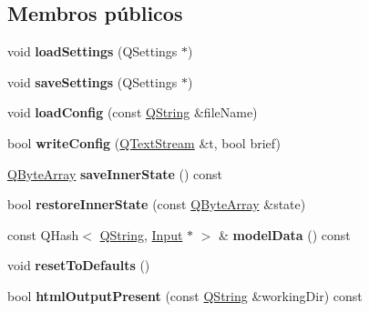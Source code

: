\subsection*{Membros públicos}
\begin{DoxyCompactItemize}
\item 
\hypertarget{class_expert_aaf7577cd0bea70f9f3463daff408f109}{void {\bfseries load\-Settings} (Q\-Settings $\ast$)}\label{class_expert_aaf7577cd0bea70f9f3463daff408f109}

\item 
\hypertarget{class_expert_a898d0b7c011edae3399d1af98e61f23d}{void {\bfseries save\-Settings} (Q\-Settings $\ast$)}\label{class_expert_a898d0b7c011edae3399d1af98e61f23d}

\item 
\hypertarget{class_expert_a7c2c676b7cf5006690dc56330f9091b7}{void {\bfseries load\-Config} (const \hyperlink{class_q_string}{Q\-String} \&file\-Name)}\label{class_expert_a7c2c676b7cf5006690dc56330f9091b7}

\item 
\hypertarget{class_expert_ae0e179390ef2007cf8f9129ee8a5e82e}{bool {\bfseries write\-Config} (\hyperlink{class_q_text_stream}{Q\-Text\-Stream} \&t, bool brief)}\label{class_expert_ae0e179390ef2007cf8f9129ee8a5e82e}

\item 
\hypertarget{class_expert_a68c90c243f380003ae39e7f8cc2795d2}{\hyperlink{class_q_array}{Q\-Byte\-Array} {\bfseries save\-Inner\-State} () const }\label{class_expert_a68c90c243f380003ae39e7f8cc2795d2}

\item 
\hypertarget{class_expert_ac5c51eb3106d59ecdac6f99de80ec698}{bool {\bfseries restore\-Inner\-State} (const \hyperlink{class_q_array}{Q\-Byte\-Array} \&state)}\label{class_expert_ac5c51eb3106d59ecdac6f99de80ec698}

\item 
\hypertarget{class_expert_afed30532e42e36e3e9eaef3aa9cdf9b0}{const Q\-Hash$<$ \hyperlink{class_q_string}{Q\-String}, \hyperlink{class_input}{Input} $\ast$ $>$ \& {\bfseries model\-Data} () const }\label{class_expert_afed30532e42e36e3e9eaef3aa9cdf9b0}

\item 
\hypertarget{class_expert_afe2b0b115ecb686b03a3499a21aa633c}{void {\bfseries reset\-To\-Defaults} ()}\label{class_expert_afe2b0b115ecb686b03a3499a21aa633c}

\item 
\hypertarget{class_expert_a32f7f351e7a78daa4fad9c4fc8351e5a}{bool {\bfseries html\-Output\-Present} (const \hyperlink{class_q_string}{Q\-String} \&working\-Dir) const }\label{class_expert_a32f7f351e7a78daa4fad9c4fc8351e5a}


\end{DoxyCompactItemize}
